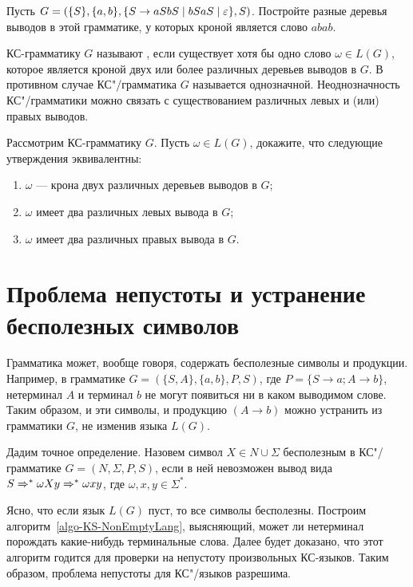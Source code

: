 \begin{myproblem}
Пусть $G=(\{S\},\{a,b\},\{S\to aSbS\mid bSaS\mid\varepsilon\},S)$. Постройте разные деревья выводов в этой грамматике, у которых кроной является слово $abab$.
\end{myproblem}

КС-грамматику $G$ называют , если существует хотя бы одно слово $\omega\in L(G)$, которое является кроной двух или более различных деревьев выводов в $G$. В противном случае КС"/грамматика $G$ называется однозначной. Неоднозначность КС"/грамматики можно связать с существованием различных левых и (или) правых выводов.

\begin{myproblem}
Рассмотрим КС-грамматику $G$. Пусть $\omega\in L(G)$, докажите, что следующие утверждения эквивалентны:
\begin{enumerate}
\item $\omega$ --- крона двух различных деревьев выводов в $G$;
\item $\omega$ имеет два различных левых вывода в $G$;
\item $\omega$ имеет два различных правых вывода в $G$.
\end{enumerate}
\end{myproblem}

\section{Проблема непустоты и устранение бесполезных символов}
\label{Chapter6-problemEmptyLang}

Грамматика может, вообще говоря, содержать бесполезные символы и продукции. Например, в грамматике $G=(\{S,A\},\{a,b\},P,S)$, где $P=\{S\to a;A\to b\}$, нетерминал $A$ и терминал $b$ не могут появиться ни в каком выводимом слове. Таким образом, и эти символы, и продукцию $(A\to b)$ можно устранить из грамматики $G$, не изменив языка $L(G)$.

Дадим точное определение. Назовем символ $X\in N\cup\Sigma$ бесполезным в КС"/грамматике $G=(N,\Sigma,P,S)$, если в ней невозможен вывод вида $S\Rightarrow^*\omega Xy\Rightarrow^*\omega xy$, где $\omega,x,y\in\Sigma^*$.

Ясно, что если язык $L(G)$ пуст, то все символы бесполезны. Построим алгоритм~\ref{algo-KS-NonEmptyLang}, выясняющий, может ли нетерминал порождать какие-нибудь терминальные слова. Далее будет доказано, что этот алгоритм годится для проверки на непустоту произвольных КС-языков. Таким образом, проблема непустоты для КС"/языков разрешима.

